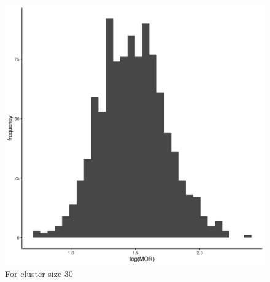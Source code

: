 \documentclass[
  letterpaper,
  DIV=11,
  numbers=noendperiod,
  titlepage]{scrartcl}
\begin{document}
\begin{figure}
\begin{minipage}[t]{0.50\linewidth}
{{\includegraphics{../../plots/two-lvl-ran-int/low-prev/hist_30_30_two_lvl_low_prev.png}

}

\caption{For cluster size 30}

}

\end{minipage}%
%
\begin{minipage}[t]{0.50\linewidth}

{\centering 

}
\end{minipage}
\end{figure}
\end{document}
